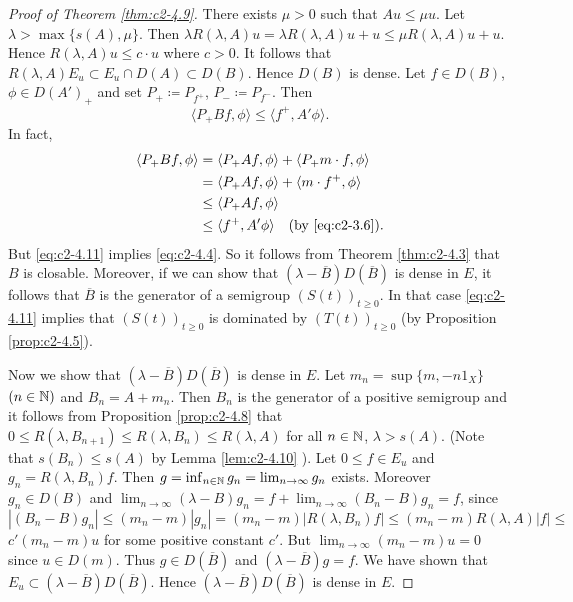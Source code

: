 \begin{proof}[Proof of Theorem \ref{thm:c2-4.9}]  
There exists $\mu > 0$ such that $Au \leq \mu u$.
Let $\lambda > \max \{s(A),\mu\}$.
Then $\lambda R(\lambda,A)u = \lambda R(\lambda,A)u+u \leq \mu R(\lambda,A)u + u$.
Hence $R(\lambda,A)u \leq c \cdot u$ where $c > 0$.
It follows that $R(\lambda,A)E_{u} \subset E_{u} \cap D(A) \subset D(B)$.
Hence $D(B)$ is dense.
Let $f \in D(B)$, $\phi \in D(A')_{+}$ and set $P_{+} \coloneqq P_{f^{+}}$, $P_{-} \coloneqq P_{f^{-}}$.
Then
\begin{equation}\label{eq:c2-4.11}
\langle P_{+} Bf,\phi \rangle \leq \langle f^{+},A'\phi \rangle.
\end{equation}
In fact, 
\begin{align*}
\langle P_{+} Bf, \phi \rangle &= \langle P_{+} Af, \phi \rangle + \langle P_{+} m \cdot f, \phi \rangle\\
&= \langle P_{+} Af, \phi \rangle + \langle m \cdot f^{+}, \phi \rangle\\
&\leq \langle P_{+} Af, \phi \rangle\\
&\leq \langle f^{+}, A'\phi \rangle \quad \text{(by \eqref{eq:c2-3.6})}.
\end{align*}
But \eqref{eq:c2-4.11} implies \eqref{eq:c2-4.4}.
So it follows from Theorem \ref{thm:c2-4.3}   that $B$ is closable.
Moreover, if we can show that $(\lambda - \overline{B})D(\overline{B})$ is dense in $E$, it follows that $\overline{B}$ is the generator of a semigroup $(S(t))_{t \geq 0}$.
In that case \eqref{eq:c2-4.11} implies that $(S(t))_{t \geq 0}$ is dominated by $(T(t))_{t \geq 0}$ 
(by Proposition \ref{prop:c2-4.5}).

Now we show that $(\lambda - \overline{B})D(\overline{B})$ is dense in $E$.
Let $m_{n} = \sup \{m, -n1_{X}\}$ $(n \in \mathbb{N} )$ and $B_{n} = A + m_{n}$.
Then $B_{n}$ is the generator of a positive semigroup and it follows from Proposition \ref{prop:c2-4.8}   that $0 \leq R(\lambda,B_{n+1}) \leq R(\lambda,B_{n}) \leq R(\lambda,A)$ for all $n \in \mathbb{N} $, $\lambda > s(A)$.
(Note that $s(B_{n}) \leq s(A)$ by Lemma \ref{lem:c2-4.10}   ).
Let $0 \leq f \in E_{u}$ and $g_{n} = R(\lambda,B_{n})f$.
Then $g = \inf_{n \in \mathbb{N} } g_{n} = \lim_{n \to \infty} g_{n}$ exists.
Moreover $g_{n} \in D(B)$ and $\lim_{n \to \infty} (\lambda - B)g_{n} = f + \lim_{n \to \infty} (B_{n} - B)g_{n} = f$, since
$|(B_{n} - B)g_{n}| \leq (m_{n} - m)|g_{n}| = (m_{n} - m)|R(\lambda,B_{n})f| \leq (m_{n} - m)R(\lambda,A)|f| \leq$
$c' (m_{n} - m)u$ for some positive constant $c'$.
But $\lim_{n \to \infty} (m_{n} - m)u = 0$ since $u \in D(m)$.
Thus $g \in D(\overline{B})$ and $(\lambda - \overline{B})g = f$.
We have shown that $E_{u} \subset (\lambda - \overline{B})D(\overline{B})$.
Hence $(\lambda - \overline{B})D(\overline{B})$ is dense in $E$.
\end{proof}

